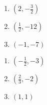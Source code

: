 \begin{multicols}{3}
\begin{enumerate}
\setcounter{enumi}{\value{HW}}

\item $\left(2, -\frac{3}{2}\right)$
\item $\left(\frac{1}{2}, -12 \right)$
\item $(-1,-7)$

\setcounter{HW}{\value{enumi}}
\end{enumerate}
\end{multicols}

\begin{multicols}{3}
\begin{enumerate}
\setcounter{enumi}{\value{HW}}

\item $\left(-\frac{1}{2}, -3\right)$
\item $\left(\frac{2}{3}, -2 \right)$
\item $(1,1)$

\setcounter{HW}{\value{enumi}}
\end{enumerate}
\end{multicols}

